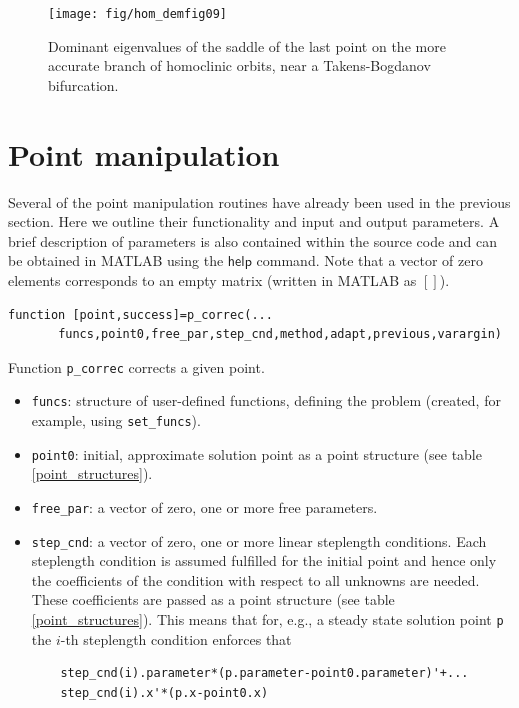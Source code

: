 \documentclass[10pt]{scrartcl}
\newcommand{\parm}[1]{\mathsf{#1}}
\newcommand{\blist}[1]{\mbox{\lstinline!#1!}}
\begin{document}
{\begin{figure}
  \begin{center}
    \texttt{[image: fig/hom\_demfig09]}
    \caption{Dominant eigenvalues of the saddle of the last point on the 
      more accurate branch
      of homoclinic orbits,
      near a Takens-Bogdanov bifurcation.\label{demo3-9}}
  \end{center}
\end{figure}

\fi
\section{Point manipulation}\label{point_manipulation}

Several of the point manipulation routines have already been used in
the previous section.  Here we outline their functionality and input
and output parameters.  A brief description of parameters is also
contained within the source code and can be obtained in MATLAB using
the $\parm{help}$ command. Note that a vector of zero elements
corresponds to an empty matrix (written in MATLAB as $[]$). 
\begin{lstlisting}
function [point,success]=p_correc(...
       funcs,point0,free_par,step_cnd,method,adapt,previous,varargin)  
\end{lstlisting}
\noindent Function \blist{p_correc} corrects a given point.
\begin{itemize}
\item \blist{funcs}: structure of user-defined functions, defining the
  problem (created, for example, using \blist{set_funcs}).
\item \blist{point0}: initial, approximate solution point as a point
  structure (see table \ref{point_structures}).
\item \blist{free_par}: a vector of zero, one or more free parameters.
\item \blist{step_cnd}: a vector of zero, one or more linear
  steplength conditions. Each steplength condition is assumed
  fulfilled for the initial point and hence only the coefficients of
  the condition with respect to all unknowns are needed. These
  coefficients are passed as a point structure (see table
  \ref{point_structures}).  This means that for, e.g., a steady state
  solution point \blist{p} the $i$-th steplength condition enforces that
  \begin{lstlisting}
    step_cnd(i).parameter*(p.parameter-point0.parameter)'+...
    step_cnd(i).x'*(p.x-point0.x)
  \end{lstlisting}

\end{itemize}}
\end{document}
